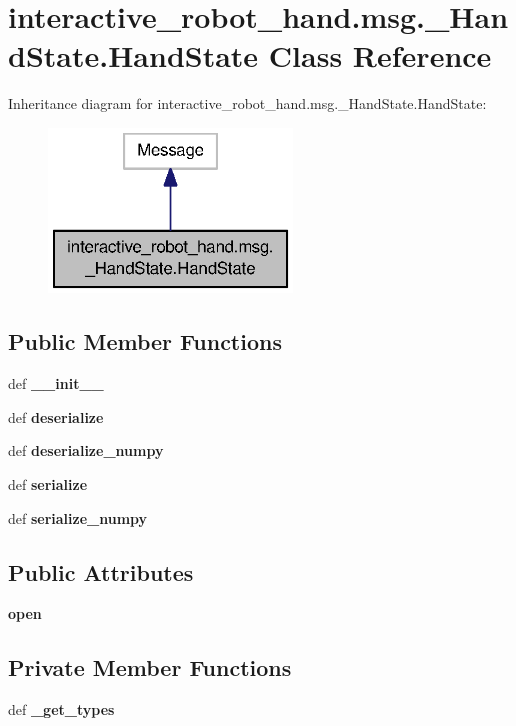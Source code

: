 \section{interactive\-\_\-robot\-\_\-hand.\-msg.\-\_\-\-Hand\-State.\-Hand\-State Class Reference}
\label{classinteractive__robot__hand_1_1msg_1_1__HandState_1_1HandState}


Inheritance diagram for interactive\-\_\-robot\-\_\-hand.\-msg.\-\_\-\-Hand\-State.\-Hand\-State\-:
\nopagebreak
\begin{figure}[H]
\begin{center}
\leavevmode
\includegraphics[width=184pt]{classinteractive__robot__hand_1_1msg_1_1__HandState_1_1HandState__inherit__graph}
\end{center}
\end{figure}
\subsection*{Public Member Functions}
\begin{DoxyCompactItemize}
\item 
def {\bf \-\_\-\-\_\-init\-\_\-\-\_\-}
\item 
def {\bf deserialize}
\item 
def {\bf deserialize\-\_\-numpy}
\item 
def {\bf serialize}
\item 
def {\bf serialize\-\_\-numpy}
\end{DoxyCompactItemize}
\subsection*{Public Attributes}
\begin{DoxyCompactItemize}
\item 
{\bf open}
\end{DoxyCompactItemize}
\subsection*{Private Member Functions}
\begin{DoxyCompactItemize}
\item 
def {\bf \-\_\-get\-\_\-types}
\end{DoxyCompactItemize}
